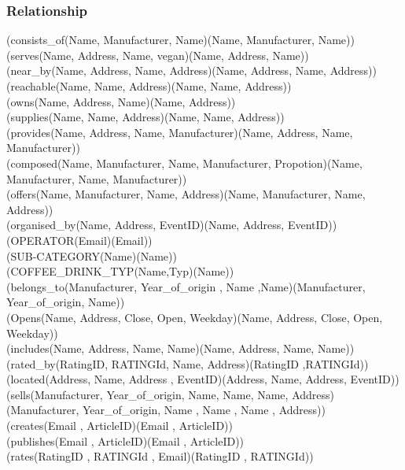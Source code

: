 \subsubsection{Relationship}
(consists\_of(Name, Manufacturer, Name)(Name, Manufacturer, Name))\\
(serves(Name, Address, Name, vegan)(Name, Address, Name))\\
(near\_by(Name, Address, Name, Address)(Name, Address, Name, Address))\\
(reachable(Name, Name, Address)(Name, Name, Address))\\
(owns(Name, Address, Name)(Name, Address))\\
(supplies(Name, Name, Address)(Name, Name, Address))\\
(provides(Name, Address, Name, Manufacturer)(Name, Address, Name, Manufacturer))\\
(composed(Name, Manufacturer, Name, Manufacturer, Propotion)(Name, Manufacturer, Name, Manufacturer))\\
(offers(Name, Manufacturer, Name, Address)(Name, Manufacturer, Name, Address))\\
(organised\_by(Name, Address, EventID)(Name, Address, EventID))\\
(OPERATOR(Email)(Email))\\
(SUB-CATEGORY(Name)(Name))\\
(COFFEE\_DRINK\_TYP(Name,Typ)(Name))\\
(belongs\_to(Manufacturer, Year\_of\_origin , Name ,Name)(Manufacturer, Year\_of\_origin, Name))\\
(Opens(Name, Address, Close, Open, Weekday)(Name, Address, Close, Open, Weekday))\\
(includes(Name, Address, Name, Name)(Name, Address, Name, Name))\\
(rated\_by(RatingID, RATINGId, Name, Address)(RatingID ,RATINGId))\\
(located(Address, Name, Address , EventID)(Address, Name, Address, EventID))\\
(sells(Manufacturer, Year\_of\_origin, Name, Name, Name, Address)(Manufacturer, Year\_of\_origin, Name , Name , Name , Address))\\
(creates(Email , ArticleID)(Email , ArticleID))\\
(publishes(Email , ArticleID)(Email , ArticleID))\\
(rates(RatingID , RATINGId , Email)(RatingID , RATINGId))
